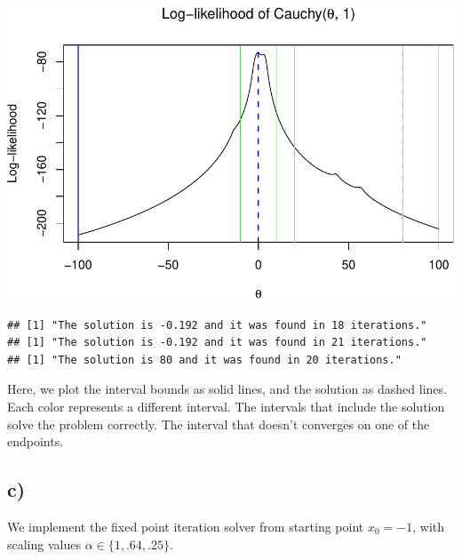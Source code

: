 \documentclass[]{article}
\begin{document}
\includegraphics{Atlas-PS_2_files/figure-latex/plot_bisection_intervals-1.pdf}

\begin{verbatim}
## [1] "The solution is -0.192 and it was found in 18 iterations."
## [1] "The solution is -0.192 and it was found in 21 iterations."
## [1] "The solution is 80 and it was found in 20 iterations."
\end{verbatim}

Here, we plot the interval bounds as solid lines, and the solution as
dashed lines. Each color represents a different interval. The intervals
that include the solution solve the problem correctly. The interval that
doesn't converges on one of the endpoints.

\subsection{c)}\label{c-1}

We implement the fixed point iteration solver from starting point
\(x_0 = -1\), with scaling values \(\alpha \in \{1, .64, .25\}\).
\end{document}
